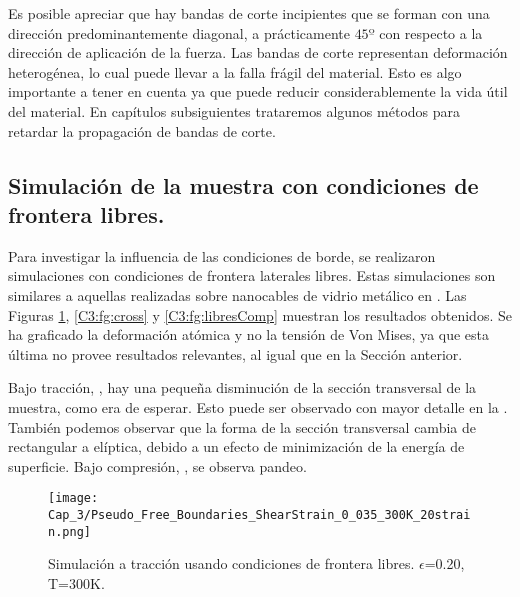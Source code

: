 Es posible apreciar que hay bandas de corte incipientes que se forman con una dirección predominantemente diagonal, a prácticamente $45º$ con respecto a la dirección de aplicación de la fuerza. Las bandas de corte representan deformación heterogénea, lo cual puede llevar a la falla frágil del material. Esto es algo importante a tener en cuenta ya que puede reducir considerablemente la vida útil del material. En capítulos subsiguientes trataremos algunos métodos para retardar la propagación de bandas de corte.

\subsection{Simulación de la muestra con condiciones de frontera libres.}
\label{S3_3_2}


Para investigar la influencia de las condiciones de borde, se realizaron simulaciones con condiciones de frontera laterales libres. Estas simulaciones son similares a aquellas realizadas sobre nanocables de vidrio metálico en \cite{xiao12}. Las Figuras \ref{C3:fg:libresTen}, \ref{C3:fg:cross} y \ref{C3:fg:libresComp} muestran los resultados obtenidos. Se ha graficado la deformación atómica y no la tensión de Von Mises, ya que esta última no provee resultados relevantes, al igual que en la Sección anterior.

Bajo tracción, , hay una pequeña disminución de la sección transversal de la muestra, como era de esperar. Esto puede ser observado con mayor detalle en la . También podemos observar que la forma de la sección transversal cambia de rectangular a elíptica, debido a un efecto de minimización de la energía de superficie. Bajo compresión, , se observa pandeo.


\begin{figure}[htp]
\centering
\texttt{[image: Cap\_3/Pseudo\_Free\_Boundaries\_ShearStrain\_0\_035\_300K\_20strain.png]}
\caption[Simulación a tracción usando condiciones de frontera libres]{Simulación a tracción usando condiciones de frontera libres. $\epsilon$=0.20, T=300K.}
\label{C3:fg:libresTen}
\end{figure}

